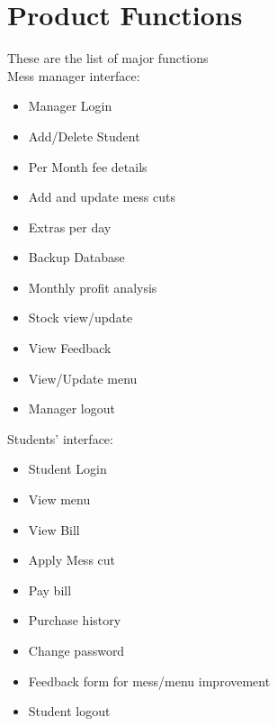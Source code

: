 \documentclass{scrreprt}
\begin{document}
\section{Product Functions}
These are the list of major functions \\
Mess manager interface:
\begin{itemize}
	\item Manager Login \\
    \item Add/Delete Student \\
    \item Per Month fee details \\
    \item Add and update mess cuts \\
    \item Extras per day\\
    \item Backup Database\\
    \item Monthly profit analysis \\
    \item Stock view/update\\
    \item View Feedback\\
    \item View/Update menu\\
    \item Manager logout \\

	\end{itemize}
Students’ interface:
\begin{itemize}
    \item Student Login \\
    \item View menu\\
    \item View Bill \\
    \item Apply Mess cut\\
    \item Pay bill\\
    \item Purchase history\\
     \item Change password \\
    \item Feedback form for mess/menu improvement \\
     \item Student logout\\
\end{itemize}   
\end{document}
